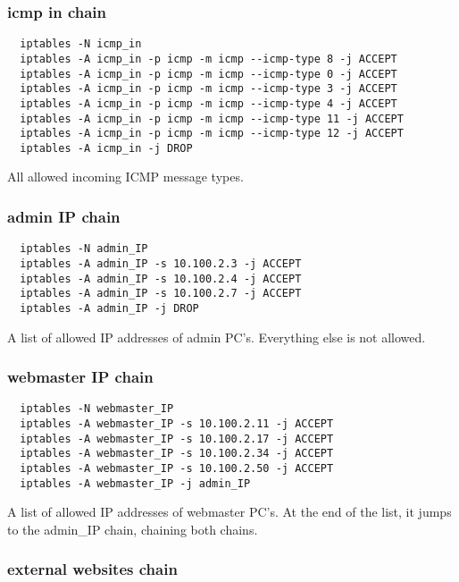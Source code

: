 \documentclass[a4paper,12pt]{article}
\begin{document}
\subsubsection{icmp in chain}

\begin{verbatim}
  iptables -N icmp_in
  iptables -A icmp_in -p icmp -m icmp --icmp-type 8 -j ACCEPT
  iptables -A icmp_in -p icmp -m icmp --icmp-type 0 -j ACCEPT
  iptables -A icmp_in -p icmp -m icmp --icmp-type 3 -j ACCEPT
  iptables -A icmp_in -p icmp -m icmp --icmp-type 4 -j ACCEPT
  iptables -A icmp_in -p icmp -m icmp --icmp-type 11 -j ACCEPT
  iptables -A icmp_in -p icmp -m icmp --icmp-type 12 -j ACCEPT
  iptables -A icmp_in -j DROP
\end{verbatim}

All allowed incoming ICMP message types.

\subsubsection{admin IP chain}

\begin{verbatim}
  iptables -N admin_IP
  iptables -A admin_IP -s 10.100.2.3 -j ACCEPT
  iptables -A admin_IP -s 10.100.2.4 -j ACCEPT
  iptables -A admin_IP -s 10.100.2.7 -j ACCEPT
  iptables -A admin_IP -j DROP
\end{verbatim}

A list of allowed IP addresses of admin PC's. Everything else is not allowed.

\subsubsection{webmaster IP chain}

\begin{verbatim}
  iptables -N webmaster_IP
  iptables -A webmaster_IP -s 10.100.2.11 -j ACCEPT
  iptables -A webmaster_IP -s 10.100.2.17 -j ACCEPT
  iptables -A webmaster_IP -s 10.100.2.34 -j ACCEPT
  iptables -A webmaster_IP -s 10.100.2.50 -j ACCEPT
  iptables -A webmaster_IP -j admin_IP
\end{verbatim}

A list of allowed IP addresses of webmaster PC's.
At the end of the list, it jumps to the admin\_IP chain, chaining both chains.


\subsubsection{external websites chain}
\end{document}
